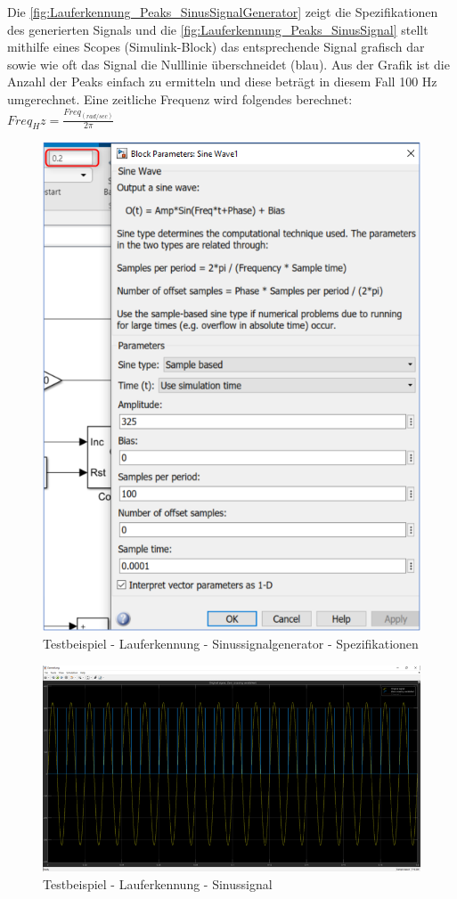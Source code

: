 Die \autoref{fig:Lauferkennung_Peaks_SinusSignalGenerator} zeigt die Spezifikationen des generierten Signals und die \autoref{fig:Lauferkennung_Peaks_SinusSignal} stellt mithilfe eines Scopes (Simulink-Block) das entsprechende Signal grafisch dar sowie wie oft das Signal die Nulllinie überschneidet (blau). Aus der Grafik ist die Anzahl der Peaks einfach zu ermitteln und diese beträgt in diesem Fall 100 Hz umgerechnet.
Eine zeitliche Frequenz wird folgendes berechnet:\\
$Freq_Hz = \frac{Freq_(rad/sec)}{2\pi}$
\begin{figure}[H]
	\centering
	\includegraphics[width=0.5\linewidth]{Bilder/Lauferkennung_Peaks_SinusSignalGenerator.png}
	\caption{Testbeispiel - Lauferkennung - Sinussignalgenerator - Spezifikationen}
	\label{fig:Lauferkennung_Peaks_SinusSignalGenerator}
\end{figure}
\begin{figure}[H]
	\centering
	\includegraphics[width=\linewidth]{Bilder/Lauferkennung_Peaks_SinusSignal.png}
	\caption{Testbeispiel - Lauferkennung - Sinussignal}
	\label{fig:Lauferkennung_Peaks_SinusSignal}
\end{figure}

